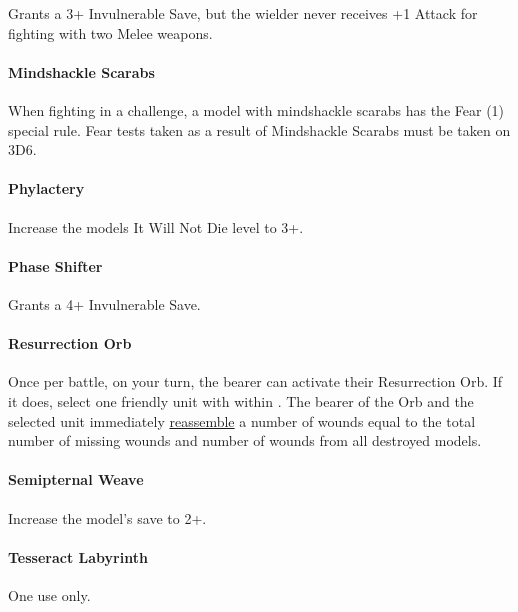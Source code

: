 Grants a 3+ Invulnerable Save, but the wielder never receives +1 Attack for fighting with two Melee weapons.

\paragraph*{Mindshackle Scarabs} \label{Mindshackle Scarabs}

When fighting in a challenge, a model with mindshackle scarabs has the Fear (1) special rule. Fear tests taken as a result of Mindshackle Scarabs must be taken on 3D6. 

\paragraph*{Phylactery} \label{Phylactery}

Increase the models It Will Not Die level to 3+.

\paragraph*{Phase Shifter} \label{Phase Shifter}

Grants a 4+ Invulnerable Save.

\paragraph*{Resurrection Orb} \label{Resurrection Orb}

Once per battle, on your turn, the bearer can activate their Resurrection Orb. If it does, select one friendly unit with  within . The bearer of the Orb and the selected unit immediately \textcolor{violet}{\hyperref[Reanimation Protocols]{reassemble}} a number of wounds equal to the total number of missing wounds and number of wounds from all destroyed models.

\paragraph*{Semipternal Weave} \label{Sempiternal Weave}

Increase the model's save to 2+.

\paragraph*{Tesseract Labyrinth} \label{Tesseract Labyrinth}

One use only.


